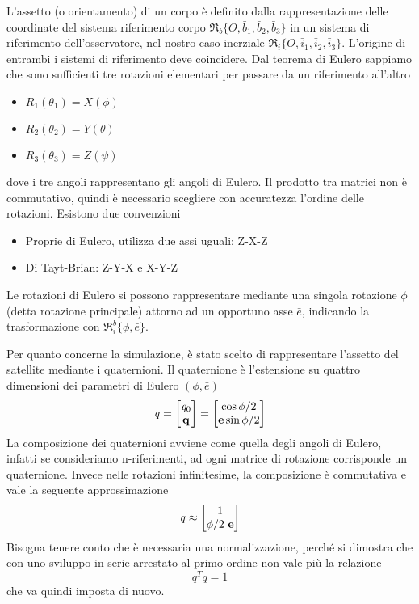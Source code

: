 L'assetto (o orientamento) di un corpo è definito dalla rappresentazione delle
coordinate del sistema riferimento corpo
$\mathfrak{R}_b\{O,\bar{b}_1,\bar{b}_2,\bar{b}_3\}$ in un sistema di riferimento
dell'osservatore, nel nostro caso inerziale
$\mathfrak{R}_i\{O,\bar{i}_1,\bar{i}_2,\bar{i}_3\}$. L'origine di entrambi i
sistemi di riferimento deve coincidere. Dal teorema di Eulero sappiamo che sono
sufficienti tre rotazioni elementari per passare da un riferimento all'altro
\begin{itemize}
  \item $R_1(\theta_1)=X(\phi)$
  \item $R_2(\theta_2)=Y(\theta)$
  \item $R_3(\theta_3)=Z(\psi)$
\end{itemize}
dove i tre angoli rappresentano gli angoli di Eulero. Il prodotto tra matrici
non è commutativo, quindi è necessario scegliere con accuratezza l'ordine delle
rotazioni. Esistono due convenzioni
\begin{itemize}
  \item Proprie di Eulero, utilizza due assi uguali: Z-X-Z
  \item Di Tayt-Brian: Z-Y-X e X-Y-Z
\end{itemize}
Le rotazioni di Eulero si possono rappresentare mediante una singola rotazione
$\phi$ (detta rotazione principale) attorno ad un opportuno asse $\bar{e}$,
indicando la trasformazione con $\mathfrak{R}_i^b\{\phi,\bar{e}\}$.

Per quanto concerne la simulazione, è stato scelto di rappresentare l'assetto
del satellite mediante i quaternioni.
Il quaternione è l'estensione su quattro dimensioni dei parametri di Eulero
$(\phi,\bar{e})$
\begin{equation}
\mathit{q}=\begin{bmatrix}
\mathit{q}_0 \\ \mathit{\bf q}
\end{bmatrix} =\begin{bmatrix}
\cos{\phi/2} \\ {\bf e}\sin{\phi/2}
\end{bmatrix}
\end{equation}
La composizione dei quaternioni avviene come quella degli angoli di Eulero,
infatti se consideriamo n-riferimenti, ad ogni matrice di rotazione corrisponde
un quaternione. Invece nelle rotazioni infinitesime, la composizione è
commutativa e vale la seguente approssimazione
\begin{equation}
\mathit{q}\approx
\begin{bmatrix}
1\\ \phi/2 \ {\bf e}
\end{bmatrix}
\end{equation}
Bisogna tenere conto che è necessaria una normalizzazione, perché si
dimostra che con uno sviluppo in serie arrestato al
primo ordine non vale più la relazione
\begin{equation}
\mathit{q}^T\mathit{q}=1
\end{equation}
che va quindi imposta di nuovo.

